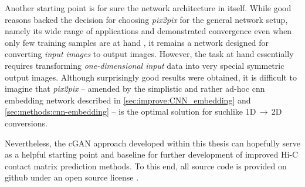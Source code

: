 Another starting point is for sure the network architecture in itself.
While good reasons backed the decision for choosing \emph{pix2pix} for the general network setup,
namely its wide range of applications and demonstrated convergence even when only few training samples are at hand \cite{Isola2017},
it remains a network designed for converting \emph{input images} to output images.
However, the task at hand essentially requires transforming \emph{one-dimensional input} data into very special symmetric output images.
Although surprisingly good results were obtained, it is difficult to imagine that \emph{pix2pix} -- amended by the simplistic and rather ad-hoc \acrshort{cnn} embedding network 
described in \cref{sec:improve:CNN_embedding} and \ref{sec:methods:cnn-embedding} -- is the optimal solution for suchlike 1D\,$\rightarrow$\,2D conversions.

Nevertheless, the cGAN approach developed within this thesis can hopefully serve as a helpful starting point and baseline
for further development of improved Hi-C contact matrix prediction methods.
To this end, all source code is provided on github under an open source license \cite{Krauth2021a, Krauth2021b} .
